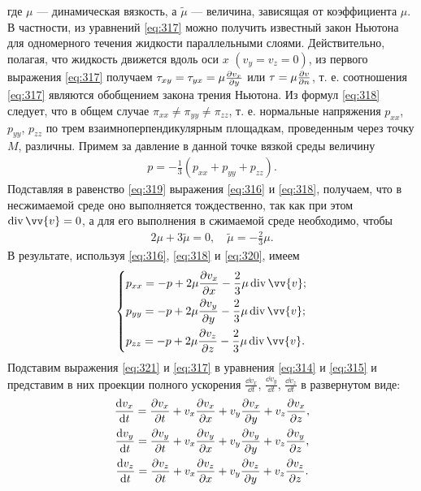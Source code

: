 	где $\mu$ --- динамическая вязкость, а $\tilde{\mu}$ --- величина, зависящая от коэффициента $\mu$.\n
	В частности, из уравнений \eqref{eq:317} можно получить известный закон Ньютона для одномерного течения жидкости параллельными слоями. Действительно, полагая, что жидкость движется вдоль оси $x$ $\left(v_y = v_z = 0\right)$, из первого выражения \eqref{eq:317} получаем $\tau_{xy} = \tau_{yx} = \mu\frac{\partial v_x}{\partial y}$ или $\tau = \mu\frac{\partial v}{\partial n}$, т. е. соотношения \eqref{eq:317} являются обобщением закона трения Ньютона.\n
	Из формул \eqref{eq:318} следует, что в общем случае $\pi_{xx} \ne \pi_{yy} \ne \pi_{zz}$, т. е. нормальные напряжения $p_{xx}$, $p_{yy}$, $p_{zz}$ по трем взаимноперпендикулярным площадкам, проведенным через точку $M$, различны. Примем за давление в данной точке вязкой среды величину
	\begin{gather}
		p = -\frac{1}{3}\left(p_{xx} + p_{yy} + p_{zz}\right).\label{eq:319}
	\end{gather}\n
	Подставляя в равенство \eqref{eq:319} выражения \eqref{eq:316} и \eqref{eq:318}, получаем, что в несжимаемой среде оно выполняется тождественно, так как при этом $\diverg\vv{v} = 0$, а для его выполнения в сжимаемой среде необходимо, чтобы
	\begin{gather}
		2\mu + 3\tilde{\mu} = 0, \quad \tilde{\mu} = -\frac{2}{3}\mu.\label{eq:320}
	\end{gather}\n
	В результате, используя \eqref{eq:316}, \eqref{eq:318} и \eqref{eq:320}, имеем
	\begin{gather}
		\begin{dcases}\label{eq:321}
			p_{xx} = -p + 2\mu\frac{\pp v_x}{\pp x} - \frac{2}{3}\mu\diverg\vv{v};\\
			p_{yy} = -p + 2\mu\frac{\pp v_y}{\pp y} - \frac{2}{3}\mu\diverg\vv{v};\\
			p_{zz} = -p + 2\mu\frac{\pp v_z}{\pp z} - \frac{2}{3}\mu\diverg\vv{v}.
		\end{dcases}
	\end{gather}\n
	Подставим выражения \eqref{eq:321} и \eqref{eq:317} в уравнения \eqref{eq:314} и \eqref{eq:315} и представим в них проекции полного ускорения $\frac{\dd v_x}{\dd t}$, $\frac{\dd v_y}{\dd t}$, $\frac{\dd v_z}{\dd t}$ в развернутом виде:
	\begin{gather*}
		\frac{\mathrm{d} v_x}{\mathrm{d} t} = \frac{\partial v_x}{\partial t} + v_x\frac{\partial v_x}{\partial x} + v_y\frac{\partial v_x}{\partial y} + v_z\frac{\partial v_x}{\partial z},\\
		\frac{\mathrm{d} v_y}{\mathrm{d} t} = \frac{\partial v_y}{\partial t} + v_x\frac{\partial v_y}{\partial x} + v_y\frac{\partial v_y}{\partial y} + v_z\frac{\partial v_y}{\partial z},\\
		\frac{\mathrm{d} v_z}{\mathrm{d} t} = \frac{\partial v_z}{\partial t} + v_x\frac{\partial v_z}{\partial x} + v_y\frac{\partial v_z}{\partial y} + v_z\frac{\partial v_z}{\partial z}.
	\end{gather*}\n
